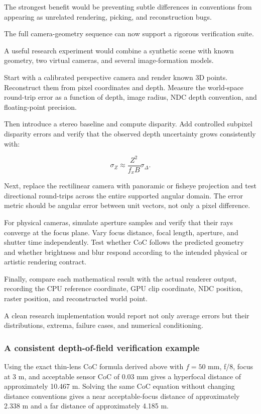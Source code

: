 The strongest benefit would be preventing subtle differences in conventions from appearing as unrelated rendering, picking, and reconstruction bugs.

The full camera-geometry sequence can now support a rigorous verification suite.

A useful research experiment would combine a synthetic scene with known geometry, two virtual cameras, and several image-formation models.

Start with a calibrated perspective camera and render known 3D points. Reconstruct them from pixel coordinates and depth. Measure the world-space round-trip error as a function of depth, image radius, NDC depth convention, and floating-point precision.

Then introduce a stereo baseline and compute disparity. Add controlled subpixel disparity errors and verify that the observed depth uncertainty grows consistently with:

\[ \boxed{ \sigma_Z\approx\frac{Z^2}{f_xB}\sigma_\Delta. } \]

Next, replace the rectilinear camera with panoramic or fisheye projection and test directional round-trips across the entire supported angular domain. The error metric should be angular error between unit vectors, not only a pixel difference.

For physical cameras, simulate aperture samples and verify that their rays converge at the focus plane. Vary focus distance, focal length, aperture, and shutter time independently. Test whether CoC follows the predicted geometry and whether brightness and blur respond according to the intended physical or artistic rendering contract.

Finally, compare each mathematical result with the actual renderer output, recording the CPU reference coordinate, GPU clip coordinate, NDC position, raster position, and reconstructed world point.

A clean research implementation would report not only average errors but their distributions, extrema, failure cases, and numerical conditioning.

\subsubsection{A consistent depth-of-field verification example}\label{a-consistent-depth-of-field-verification-example}

Using the exact thin-lens CoC formula derived above with \(f=50\) mm, f/8, focus at 3 m, and acceptable sensor CoC of 0.03 mm gives a hyperfocal distance of approximately 10.467 m. Solving the same CoC equation without changing distance conventions gives a near acceptable-focus distance of approximately 2.338 m and a far distance of approximately 4.185 m.

